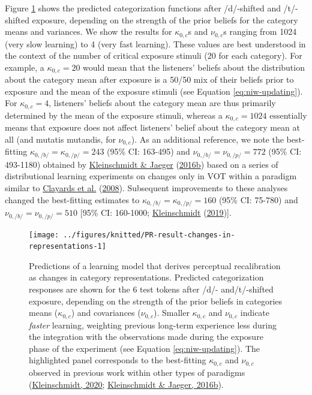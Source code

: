 \documentclass[
  11pt,
  english,
  man,floatsintext]{apa6}
\begin{document}
Figure \ref{fig:PR-result-changes-in-representations} shows the predicted categorization functions after /d/-shifted and /t/-shifted exposure, depending on the strength of the prior beliefs for the category means and variances. We show the results for \(\kappa_{0,c}\)s and \(\nu_{0,c}\)s ranging from 1024 (very slow learning) to 4 (very fast learning). These values are best understood in the context of the number of critical exposure stimuli (20 for each category). For example, a \(\kappa_{0,c}=20\) would mean that the listeners' beliefs about the distribution about the category mean after exposure is a 50/50 mix of their beliefs prior to exposure and the mean of the exposure stimuli (see Equation \eqref{eq:niw-updating}). For \(\kappa_{0,c}=4\), listeners' beliefs about the category mean are thus primarily determined by the mean of the exposure stimuli, whereas a \(\kappa_{0,c}=1024\) essentially means that exposure does not affect listeners' belief about the category mean at all (and mutatis mutandis, for \(\nu_{0,c}\)). As an additional reference, we note the best-fitting \(\kappa_{0,/b/}=\kappa_{0,/p/}=243\) (95\% CI: 163-495) and \(\nu_{0,/b/}=\nu_{0,/p/}=772\) (95\% CI: 493-1180) obtained by \protect\hyperlink{ref-kleinschmidt-jaeger2016cogsci}{Kleinschmidt \& Jaeger} (\protect\hyperlink{ref-kleinschmidt-jaeger2016cogsci}{2016b}) based on a series of distributional learning experiments on changes only in VOT within a paradigm similar to \protect\hyperlink{ref-clayards2008}{Clayards et al.} (\protect\hyperlink{ref-clayards2008}{2008}). Subsequent improvements to these analyses changed the best-fitting estimates to \(\kappa_{0,/b/}=\kappa_{0,/p/}=160\) (95\% CI: 75-780) and \(\nu_{0,/b/}=\nu_{0,/p/}=510\) {[}95\% CI: 160-1000; \protect\hyperlink{ref-kleinschmidt2019}{Kleinschmidt} (\protect\hyperlink{ref-kleinschmidt2019}{2019}){]}.



\begin{figure}

{\centering \texttt{[image: ../figures/knitted/PR-result-changes-in-representations-1]} 

}

\caption{Predictions of a learning model that derives perceptual recalibration as changes in category representations. Predicted categorization responses are shown for the 6 test tokens after /d/- and/t/-shifted exposure, depending on the strength of the prior beliefs in categories means (\(\kappa_{0,c}\)) and covariances (\(\nu_{0,c}\)). Smaller \(\kappa_{0,c}\) and \(\nu_{0,c}\) indicate \emph{faster} learning, weighting previous long-term experience less during the integration with the observations made during the exposure phase of the experiment (see Equation \eqref{eq:niw-updating}). The highlighted panel corresponds to the best-fitting \(\kappa_{0,c}\) and \(\nu_{0,c}\) observed in previous work within other types of paradigms (\protect\hyperlink{ref-kleinschmidt2020}{Kleinschmidt, 2020}; \protect\hyperlink{ref-kleinschmidt-jaeger2016cogsci}{Kleinschmidt \& Jaeger, 2016b}).}\label{fig:PR-result-changes-in-representations}
\end{figure}
\end{document}
